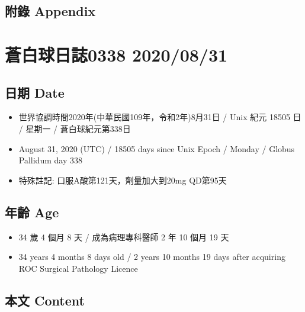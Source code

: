 \documentclass[a5paper, 11pt
]{book}
\providecommand{\tightlist}{%
  \setlength{\itemsep}{0pt}\setlength{\parskip}{0pt}}
\begin{document}
\hypertarget{ux9644ux9304-appendix-75}{%
\subsection{附錄 Appendix}\label{ux9644ux9304-appendix-75}}

\hypertarget{ux84bcux767dux7403ux65e5ux8a8c0338-20200831}{%
\section{蒼白球日誌0338
2020/08/31}\label{ux84bcux767dux7403ux65e5ux8a8c0338-20200831}}

\hypertarget{ux65e5ux671f-date-76}{%
\subsection{日期 Date}\label{ux65e5ux671f-date-76}}

\begin{itemize}
\tightlist
\item
  世界協調時間2020年(中華民國109年，令和2年)8月31日 / Unix 紀元 18505 日
  / 星期一 / 蒼白球紀元第338日
\item
  August 31, 2020 (UTC) / 18505 days since Unix Epoch / Monday / Globus
  Pallidum day 338
\item
  特殊註記: 口服A酸第121天，劑量加大到20mg QD第95天
\end{itemize}

\hypertarget{ux5e74ux9f61-age-76}{%
\subsection{年齡 Age}\label{ux5e74ux9f61-age-76}}

\begin{itemize}
\tightlist
\item
  34 歲 4 個月 8 天 / 成為病理專科醫師 2 年 10 個月 19 天
\item
  34 years 4 months 8 days old / 2 years 10 months 19 days after
  acquiring ROC Surgical Pathology Licence
\end{itemize}

\hypertarget{ux672cux6587-content-76}{%
\subsection{本文 Content}\label{ux672cux6587-content-76}}
\end{document}
